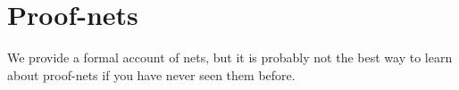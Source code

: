 \chapter{Proof-nets}\label{proof-nets}

We provide a formal account of nets,
but it is probably not the best way to learn about proof-nets if you
have never seen them before.


